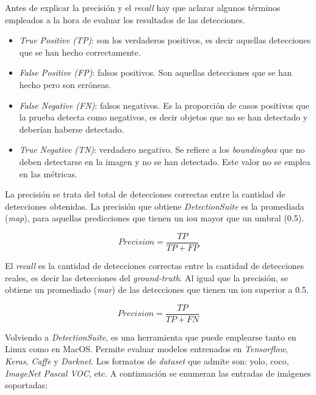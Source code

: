 Antes de explicar la precisión y el \textit{recall} hay que aclarar algunos términos empleados a la hora de evaluar los resultados de las detecciones. 

\begin{itemize}
    \item \textit{True Positive (TP)}: son los verdaderos positivos, es decir aquellas detecciones que se han hecho correctamente.
    \item \textit{False Positive (FP)}: falsos positivos. Son aquellas detecciones que se han hecho pero son erróneas.
    \item \textit{False Negative (FN)}: falsos negativos. Es la proporción de casos positivos que la prueba detecta como negativos, es decir objetos que no se han detectado y deberían haberse detectado.
    \item \textit{True Negative (TN)}: verdadero negativo. Se refiere a los \textit{boundingbox} que no deben detectarse en la imagen y no se han detectado. Este valor no se emplea en las métricas.
\end{itemize}

La precisión se trata del total de detecciones correctas entre la cantidad de detecciones obtenidas. La precisión que obtiene \textit{DetectionSuite} es la promediada (\textit{\acrfull{map}}), para aquellas predicciones que tienen un \acrshort{iou} mayor que un umbral (0.5).

\begin{equation}\label{precision}
Precision = \frac{TP}{TP + FP}
\end{equation}

El \textit{recall} es la cantidad de detecciones correctas entre la cantidad de detecciones reales, es decir las detecciones del \textit{ground-truth}. Al igual que la precisión, se obtiene un promediado (\textit{\acrfull{mar}}) de las detecciones que tienen un \acrshort{iou} superior a 0.5.

\begin{equation}\label{recall}
Precision = \frac{TP}{TP + FN}
\end{equation}

Volviendo a \textit{DetectionSuite}, es una herramienta que puede emplearse tanto en Linux como en MacOS. Permite evaluar modelos entrenados en \textit{Tensorflow}, \textit{Keras}, \textit{Caffe} y \textit{Darknet}. Los formatos de \textit{dataset} que admite son:  \acrshort{yolo}, \acrshort{coco}, \textit{ImageNet Pascal VOC}, etc. A continuación se enumeran las entradas de imágenes soportadas:

